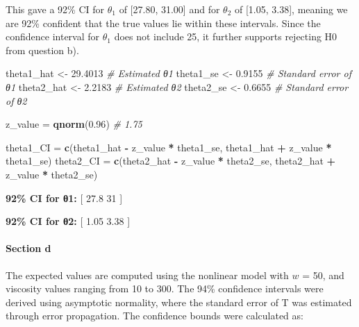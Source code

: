 \documentclass[
  11pt,
]{article}
\newenvironment{Shaded}{\begin{snugshade}}{\end{snugshade}}
\newcommand{\CommentTok}[1]{\textcolor[rgb]{0.56,0.35,0.01}{\textit{#1}}}
\newcommand{\FloatTok}[1]{\textcolor[rgb]{0.00,0.00,0.81}{#1}}
\newcommand{\FunctionTok}[1]{\textcolor[rgb]{0.13,0.29,0.53}{\textbf{#1}}}
\newcommand{\NormalTok}[1]{#1}
\newcommand{\OtherTok}[1]{\textcolor[rgb]{0.56,0.35,0.01}{#1}}
\newcommand{\SpecialCharTok}[1]{\textcolor[rgb]{0.81,0.36,0.00}{\textbf{#1}}}
\begin{document}
This gave a 92\% CI for \(\theta_1\)\hspace{0pt} of {[}27.80, 31.00{]}
and for \(\theta_2\)\hspace{0pt} of {[}1.05, 3.38{]}, meaning we are
92\% confident that the true values lie within these intervals. Since
the confidence interval for \(\theta_1\)\hspace{0pt} does not include
25, it further supports rejecting H0\hspace{0pt} from question b).

\begin{Shaded}
\begin{Highlighting}[]
\NormalTok{theta1\_hat }\OtherTok{\textless{}{-}} \FloatTok{29.4013}  \CommentTok{\# Estimated θ1}
\NormalTok{theta1\_se }\OtherTok{\textless{}{-}} \FloatTok{0.9155}    \CommentTok{\# Standard error of θ1}
\NormalTok{theta2\_hat }\OtherTok{\textless{}{-}} \FloatTok{2.2183}   \CommentTok{\# Estimated θ2}
\NormalTok{theta2\_se }\OtherTok{\textless{}{-}} \FloatTok{0.6655}    \CommentTok{\# Standard error of θ2}

\NormalTok{z\_value }\OtherTok{=} \FunctionTok{qnorm}\NormalTok{(}\FloatTok{0.96}\NormalTok{)  }\CommentTok{\# 1.75}

\NormalTok{theta1\_CI }\OtherTok{=} \FunctionTok{c}\NormalTok{(theta1\_hat }\SpecialCharTok{{-}}\NormalTok{ z\_value }\SpecialCharTok{*}\NormalTok{ theta1\_se, theta1\_hat }\SpecialCharTok{+}\NormalTok{ z\_value }\SpecialCharTok{*}\NormalTok{ theta1\_se)}
\NormalTok{theta2\_CI }\OtherTok{=} \FunctionTok{c}\NormalTok{(theta2\_hat }\SpecialCharTok{{-}}\NormalTok{ z\_value }\SpecialCharTok{*}\NormalTok{ theta2\_se, theta2\_hat }\SpecialCharTok{+}\NormalTok{ z\_value }\SpecialCharTok{*}\NormalTok{ theta2\_se)}
\end{Highlighting}
\end{Shaded}

\textbf{92\% CI for θ1:} {[} 27.8 31 {]}

\textbf{92\% CI for θ2:} {[} 1.05 3.38 {]}

\paragraph{Section d}\label{section-d-1}

The expected values are computed using the nonlinear model with \(w\) =
50, and viscosity values ranging from 10 to 300. The 94\% confidence
intervals were derived using asymptotic normality, where the standard
error of T was estimated through error propagation. The confidence
bounds were calculated as:
\end{document}
